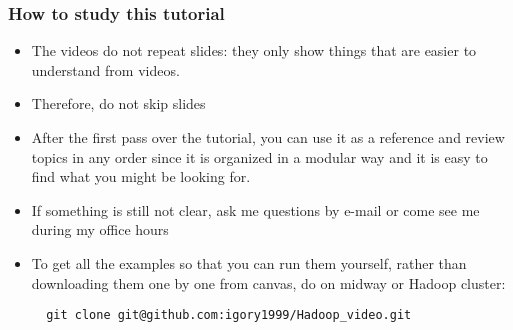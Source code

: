 \documentclass{beamer}
\begin{document}
\begin{frame}[fragile]
  \frametitle{How to study this tutorial}
  \begin{itemize}
  \item The videos do not repeat slides:
    they only show things that are easier to understand from videos.
  \item Therefore, do not skip slides
  \item After the first pass over the tutorial, you can use it as a reference and review topics in any order
    since it is organized in a modular way and it is easy to find what you might be looking for.    
  \item If something is still not clear, ask me questions by e-mail or come see me during my office hours
  \item To get all the examples so that you can run them yourself,
    rather than downloading them one by one from canvas, do on midway or Hadoop cluster:
    {\color{mycolorcli}
\begin{verbatim}
  git clone git@github.com:igory1999/Hadoop_video.git
\end{verbatim}
    }
  \end{itemize}
\end{frame}
\end{document}
